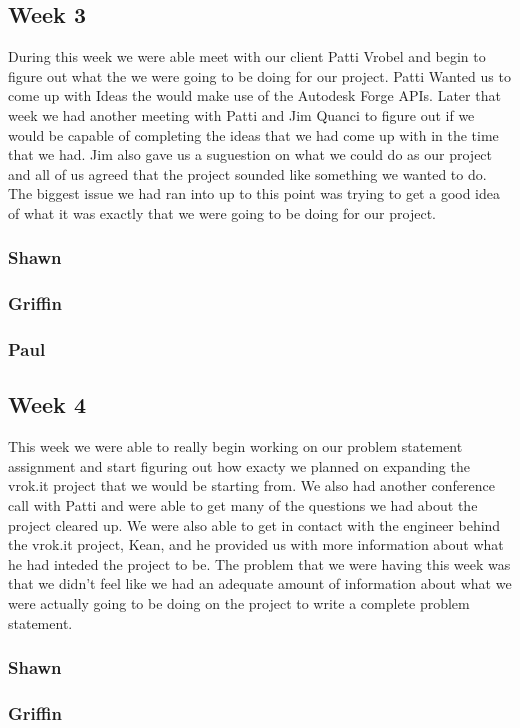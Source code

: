 \documentclass[10pt,draftclsnofoot,onecolumn]{IEEEtran}
\begin{document}
\subsection{Week 3}
	During this week we were able meet with our client Patti Vrobel and begin to figure out what the we were going to be doing for our project. Patti Wanted us to come up with Ideas the would make use of the Autodesk Forge APIs. Later that week we had another meeting with Patti and Jim Quanci to figure out if we would be capable of completing the ideas that we had come up with in the time that we had. Jim also gave us a suguestion on what we could do as our project and all of us agreed that the project sounded like something we wanted to do. The biggest issue we had ran into up to this point was trying to get a good idea of what it was exactly that we were going to be doing for our project.   
\subsubsection{Shawn}
\subsubsection{Griffin}
\subsubsection{Paul}

\subsection{Week 4}
	This week we were able to really begin working on our problem statement assignment and start figuring out how exacty we planned on expanding the vrok.it project that we would be starting from. We also had another conference call with Patti and were able to get many of the questions we had about the project cleared up. We were also able to get in contact with the engineer behind the vrok.it project, Kean, and he provided us with more information about what he had inteded the project to be. The problem that we were having this week was that we didn't feel like we had an adequate amount of information about what we were actually going to be doing on the project to write a complete problem statement. 
\subsubsection{Shawn}
\subsubsection{Griffin}
\end{document}
